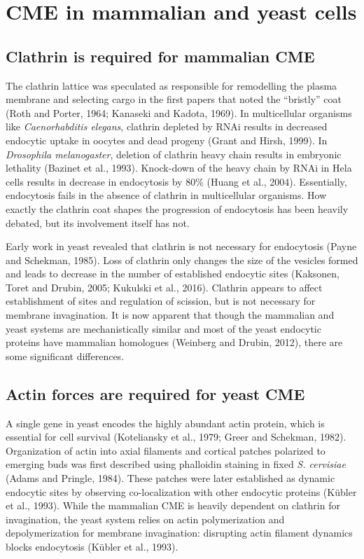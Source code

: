 	
\section{CME in mammalian and yeast cells }
		\subsection{Clathrin is required for mammalian CME}
The clathrin lattice was speculated as responsible for remodelling the plasma membrane and selecting cargo in the first papers that noted the “bristly” coat (Roth and Porter, 1964; Kanaseki and Kadota, 1969).  In multicellular organisms like \textit{Caenorhabditis elegans}, clathrin depleted by RNAi results in decreased endocytic uptake in oocytes and dead progeny (Grant and Hirsh, 1999). In \textit{Drosophila melanogaster}, deletion of clathrin heavy chain results in embryonic lethality (Bazinet et al., 1993). Knock-down of the heavy chain by RNAi in Hela cells results in decrease in endocytosis by 80\% (Huang et al., 2004). Essentially, endocytosis fails in the absence of clathrin in multicellular organisms. How exactly the clathrin coat shapes the progression of endocytosis has been heavily debated, but its involvement itself has not. 

\vspace{5mm}
Early work in yeast revealed that clathrin is not necessary for endocytosis (Payne and Schekman, 1985). Loss of clathrin only changes the size of the vesicles formed and leads to decrease in the number of established endocytic sites (Kaksonen, Toret and Drubin, 2005; Kukulski et al., 2016). Clathrin appears to affect establishment of sites and regulation of scission, but is not necessary for membrane invagination. It is now apparent that though the mammalian and yeast systems are mechanistically similar and most of the yeast endocytic proteins have mammalian homologues (Weinberg and Drubin, 2012), there are some significant differences.


		\subsection{Actin forces are required for yeast CME}
A single gene in yeast encodes the highly abundant actin protein, which is essential for cell survival (Koteliansky et al., 1979; Greer and Schekman, 1982). Organization of actin into axial filaments and cortical patches polarized to emerging buds was first described using phalloidin staining in fixed \textit{S. cervisiae} (Adams and Pringle, 1984). These patches were later established as dynamic endocytic sites by observing co-localization with other endocytic proteins (Kübler et al., 1993). While the mammalian CME is heavily dependent on clathrin for invagination, the yeast system relies on actin polymerization and depolymerization for membrane invagination: disrupting actin filament dynamics blocks endocytosis (Kübler et al., 1993). 



